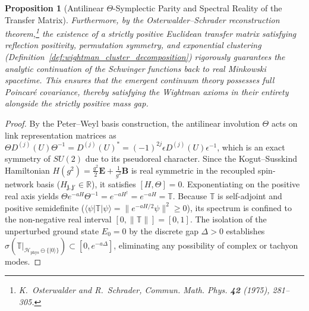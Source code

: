 \documentclass[11pt,reqno]{article}
\newtheorem{proposition}[theorem]{Proposition}
\begin{document}
\begin{proposition}[Antilinear $\Theta$-Symplectic Parity and Spectral Reality of the Transfer Matrix]
Furthermore, by the Osterwalder--Schrader reconstruction theorem,\footnote{K.~Osterwalder and R.~Schrader, Commun. Math. Phys. \textbf{42} (1975), 281--305.} the existence of a strictly positive Euclidean transfer matrix satisfying reflection positivity, permutation symmetry, and exponential clustering (Definition~\ref{def:wightman_cluster_decomposition}) rigorously guarantees the analytic continuation of the Schwinger functions back to real Minkowski spacetime. This ensures that the emergent continuum theory possesses full Poincaré covariance, thereby satisfying the Wightman axioms in their entirety alongside the strictly positive mass gap.
\end{proposition}

\begin{proof}
By the Peter--Weyl basis construction, the antilinear involution $\Theta$ acts on link representation matrices as $\Theta D^{(j)}(U) \Theta^{-1} = D^{(j)}(U)^* = (-1)^{2j} \epsilon D^{(j)}(U) \epsilon^{-1}$, which is an exact symmetry of $SU(2)$ due to its pseudoreal character.
Since the Kogut--Susskind Hamiltonian $H(g^2) = \frac{g^2}{2}\mathbf{E} + \frac{1}{g^2}\mathbf{B}$ is real symmetric in the recoupled spin-network basis ($H_{\mathbf{j},\mathbf{j}'} \in \mathbb{R}$), it satisfies $[H, \Theta] = 0$.
Exponentiating on the positive real axis yields $\Theta e^{-a H} \Theta^{-1} = e^{-a H^\dagger} = e^{-a H} = \mathbb{T}$.
Because $\mathbb{T}$ is self-adjoint and positive semidefinite ($\langle \psi | \mathbb{T} | \psi \rangle = \|e^{-a H/2}\psi\|^2 \ge 0$), its spectrum is confined to the non-negative real interval $[0, \|\mathbb{T}\|] = [0, 1]$.
The isolation of the unperturbed ground state $E_0 = 0$ by the discrete gap $\Delta > 0$ establishes $\sigma(\mathbb{T}|_{\mathcal{H}_{\mathrm{phys}} \ominus \{|0\rangle\}}) \subset [0, e^{-a\Delta}]$, eliminating any possibility of complex or tachyon modes.
\end{proof}
\end{document}
